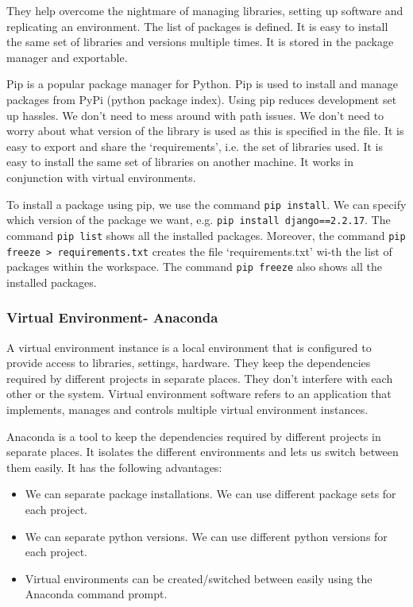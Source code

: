 \documentclass[a4paper, openany]{memoir}
\begin{document}
    \noindent They help overcome the nightmare of managing libraries, setting up software and replicating an environment. The list of packages is defined. It is easy to install the same set of libraries and versions multiple times. It is stored in the package manager and exportable.

    \noindent Pip is a popular package manager for Python. Pip is used to install and manage packages from PyPi (python package index). Using pip reduces development set up hassles. We don't need to mess around with path issues. We don't need to worry about what version of the library is used as this is specified in the file. It is easy to export and share the `requirements', i.e. the set of libraries used. It is easy to install the same set of libraries on another machine. It works in conjunction with virtual environments.

    \noindent To install a package using pip, we use the command \texttt{pip install}. We can specify which version of the package we want, e.g. \texttt{pip install django==2.2.17}. The command \texttt{pip list} shows all the installed packages. Moreover, the command \texttt{pip freeze > requirements.txt} creates the file `requirements.txt' wi-th the list of packages within the workspace. The command \texttt{pip freeze} also shows all the installed packages.

    \subsubsection{Virtual Environment- Anaconda}
    A virtual environment instance is a local environment that is configured to provide access to libraries, settings, hardware. They keep the dependencies required by different projects in separate places. They don't interfere with each other or the system. Virtual environment software refers to an application that implements, manages and controls multiple virtual environment instances.

    \noindent Anaconda is a tool to keep the dependencies required by different projects in separate places. It isolates the different environments and lets us switch between them easily. It has the following advantages:
    \begin{itemize}
        \item We can separate package installations. We can use different package sets for each project.
        \item We can separate python versions. We can use different python versions for each project.
        \item Virtual environments can be created/switched between easily using the Anaconda command prompt.
    \end{itemize}
\end{document}
